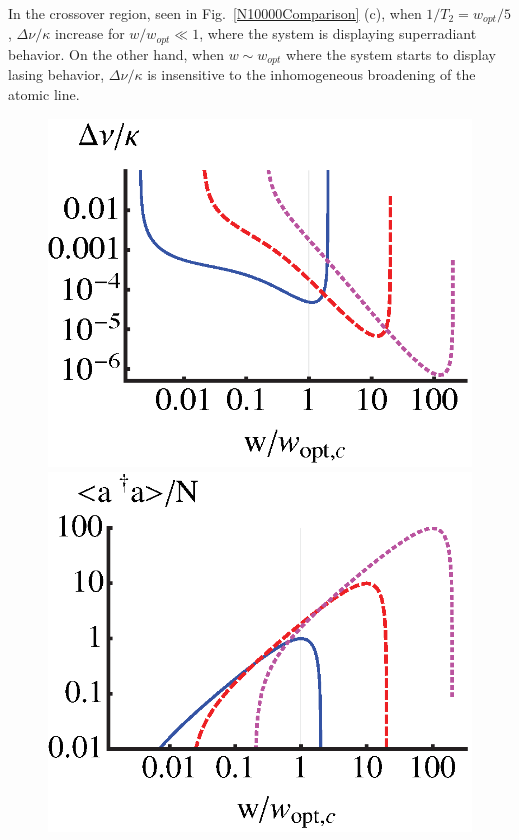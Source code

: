 \documentclass[aps,
twocolumn,
showpacs,
superscriptaddress,groupedaddress]{revtex4}
\begin{document}
In the crossover region, seen in Fig.~\ref{N10000Comparison} (c), when
$1/T_2=w_{opt}/5$, $\Delta \nu/\kappa$ increase for $w/w_{opt}\ll 1$,
where the system is displaying superradiant behavior.  On the other
hand, when $w \sim w_{opt}$ where the
system starts to display lasing behavior, $\Delta\nu/\kappa$ is
insensitive to the inhomogeneous broadening of the atomic line.
\begin{figure}
\begin{center}
	\includegraphics[scale =0.415] {LinewidthComparisonLangevin.eps}
	\hspace{-4mm} \includegraphics[scale =0.415] {adaComparisonLangevin.eps}\\

\end{center}
\end{figure}
\end{document}
